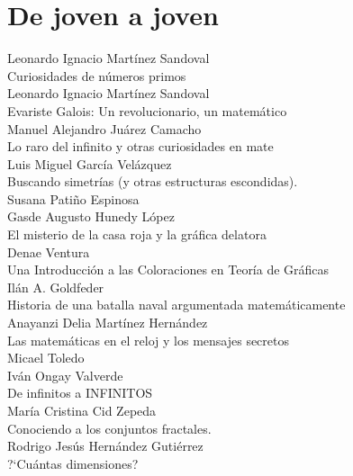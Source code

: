 \section{De joven a joven}

Leonardo Ignacio Mart\'inez Sandoval\\
Curiosidades de n\'umeros primos\\

Leonardo Ignacio Mart\'inez Sandoval\\
Evariste Galois: Un revolucionario, un matem\'atico\\

Manuel Alejandro Ju\'arez Camacho\\
Lo raro del infinito y otras curiosidades en mate\\

Luis Miguel Garc\'ia Vel\'azquez\\
Buscando simetr\'ias (y otras estructuras escondidas).\\

Susana Pati\~no Espinosa\\

Gasde Augusto Hunedy L\'opez\\
El misterio de la casa roja y la gr\'afica delatora\\

Denae Ventura\\
Una Introducci\'on a las Coloraciones en Teor\'ia de Gr\'aficas\\

Il\'an A. Goldfeder\\
Historia de una batalla naval argumentada matem\'aticamente\\

Anayanzi Delia Mart\'inez Hern\'andez\\
Las matem\'aticas en el reloj y los mensajes secretos\\

Micael Toledo\\

Iv\'an Ongay Valverde\\
De infinitos a INFINITOS\\

Mar\'ia Cristina Cid Zepeda\\
Conociendo a los conjuntos fractales.\\

Rodrigo Jes\'us Hern\'andez Guti\'errez\\
?`Cu\'antas dimensiones?\\

